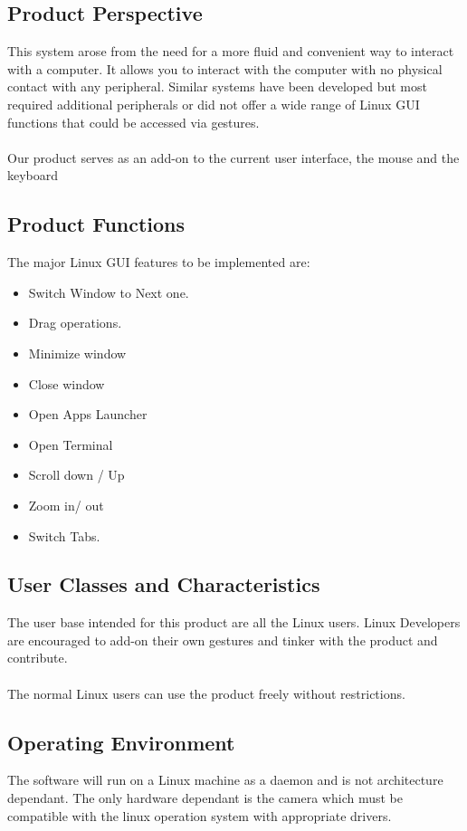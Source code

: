 \documentclass[11pt]{report}
\begin{document}
\subsection{Product Perspective}

This system arose from the need for a more fluid and convenient way to interact with a computer. It allows you to interact with the computer with no physical contact with any peripheral. Similar systems have been developed but most required additional peripherals or did not offer a wide range of Linux GUI functions that could be accessed via gestures.
\\
\\Our product serves as an add-on to the current user interface, the mouse and the keyboard  

\subsection{Product Functions}
The major Linux GUI features to be implemented are:
\begin{itemize}
    \item Switch Window to Next one.
    \item Drag operations. 
    \item Minimize window
    \item Close window
    \item Open Apps Launcher
    \item Open Terminal
    \item Scroll down / Up
    \item Zoom in/ out
    \item Switch Tabs.
\end{itemize}

\subsection{User Classes and Characteristics}
The user base intended for this product are all the Linux users. Linux Developers are encouraged to add-on their own gestures and tinker with the product and contribute.
\\
\\The normal Linux users can use the product freely without restrictions.

\subsection{Operating Environment}
The software will run on a Linux machine as a daemon and is not architecture dependant. The only hardware dependant is the camera which must be compatible with the linux operation system with appropriate drivers.
\end{document}
